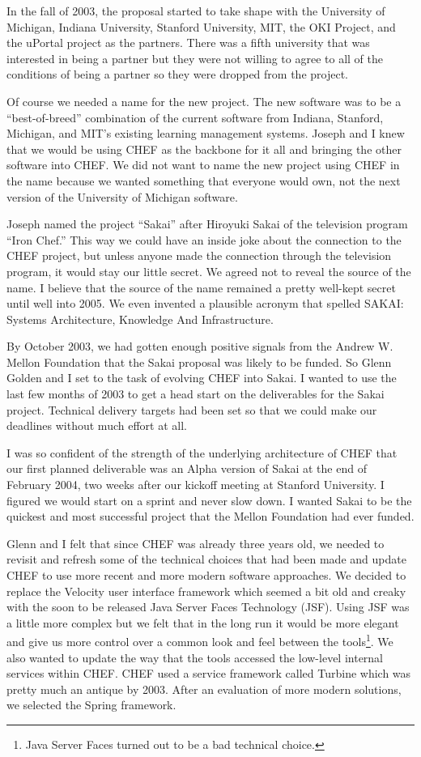 \documentclass[12pt]{book}
\begin{document}
In the fall of 2003, the proposal started to take shape with the University of Michigan,
Indiana University, Stanford University, MIT, the OKI Project, and the uPortal project
as the partners.  There was a fifth university that was interested in being a partner
but they were not willing to agree to all of the conditions of being a partner so they
were dropped from the project.

Of course we needed a name for the new project.  The new software was to be a ``best-of-breed''
combination of the current software from Indiana, Stanford, Michigan, and MIT's existing
learning management systems.  Joseph and I knew that we would be using CHEF as the backbone
for it all and bringing the other software into CHEF.  We did not want to name the new project
using CHEF in the name because we wanted something that everyone would own, not the next version
of the University of Michigan software.

Joseph named the project ``Sakai'' after Hiroyuki Sakai
of the television program ``Iron Chef.''
This way we could have an inside joke about the connection to the CHEF project, but unless
anyone made the connection through the television program, it would stay our little secret.
We agreed not to reveal the source of the name.  I believe that the source of the name remained
a pretty well-kept secret until well into 2005.
We even invented a plausible acronym that spelled SAKAI:
Systems Architecture, Knowledge And Infrastructure.

By October 2003, we had gotten enough positive signals from the Andrew W. Mellon Foundation
that the Sakai proposal was likely to be funded.  So Glenn Golden and I set to the task of
evolving CHEF into Sakai.  I wanted to use the last few months of 2003 to get a head start
on the deliverables for the Sakai project.   Technical delivery targets had been set so that
we could make our deadlines without much effort at all.

I was so confident of the strength of
the underlying architecture of CHEF that our first planned deliverable was an Alpha
version of Sakai at the end of February 2004, two weeks after our kickoff meeting at
Stanford University.  I figured we would start on a sprint and never slow down.
I wanted Sakai to be the quickest and most successful project that the Mellon
Foundation had ever funded.

Glenn and I felt that since CHEF was already three years old, we needed to revisit
and refresh some of the technical choices that had been made and update CHEF to
use more recent and more modern software approaches.  We decided to replace the
Velocity user interface framework which seemed a bit old and creaky with the soon
to be released Java Server Faces Technology (JSF).  Using JSF was a little more complex
but we felt that in the long run it would be more elegant and give us more control
over a common look and feel between the tools\footnote{Java Server Faces turned out to be
a bad technical choice.}.  We also wanted to update the way
that the tools accessed the low-level internal services within CHEF.   CHEF used
a service framework called Turbine which was pretty much an antique by 2003.
After an evaluation of more modern solutions, we selected the Spring framework.
\end{document}
